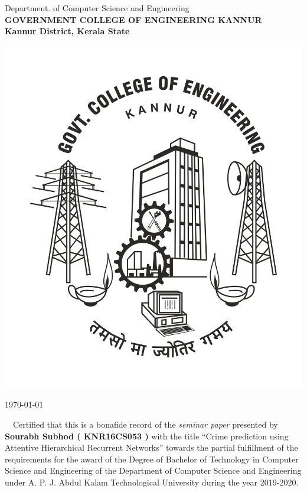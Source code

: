\begin{center}
     { {\sc Department. of Computer Science and Engineering}}\\
     {\bf \MakeUppercase{Government College  of Engineering Kannur}}\\
     {\bf Kannur District, Kerala State}\\ \bigskip   
        
      \vspace*{25pt}
      \centerline{\includegraphics [keepaspectratio=true, scale=.2]{gcek.jpg}}
      \vspace*{2cm}
      \large {}
      \vspace*{1cm}     
\end{center}

\begin{flushright}
{\today}\\ \bigskip                                  
\end{flushright}

\jadafont
  {~~Certified that this  is a bonafide record of the {\em seminar paper} presented by {\bf Sourabh Subhod (  
  {KNR16CS053} )} with the title ``{{\sc \large Crime prediction using Attentive Hierarchical
  Recurrent Networks}}'' towards the partial fulfillment of the 
  requirements for the award of the Degree of Bachelor of Technology in Computer Science and Engineering of the 
  Department of Computer Science and Engineering under A. P. J. Abdul Kalam Technological University
  during the year 2019-2020.
  }
  
